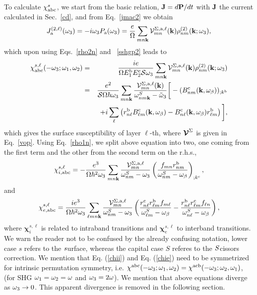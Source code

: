 \documentclass{article}
\begin{document}
To calculate $\chi_{\mathrm{a}\mathrm{b}\mathrm{c}}^s$,
we start from the basic relation, $\mathbf{J}=d\mathbf{P}/dt$ 
with $\mathbf{J}$ the current calculated in Sec.~\ref{cd}, and
from Eq.~\eqref{jmac2} we obtain
\begin{equation}\label{Pjikn}
J_{\mathrm{a}}^{(2,\ell)}(\omega_3)=-i\omega_3P_{\mathrm{a}}(\omega_3)
=\frac{e}{\Omega}
\sum_{mn\mathbf{k}}
{\mathbf{\cal V}}^{\Sigma,\mathrm{a},\ell}_{mn}(\mathbf{k})
\rho^{(2)}_{nm}(\mathbf{k};\omega_3)
,
\end{equation}
which upon using Eqs.~\eqref{rho2n} and ~\eqref{sshgp2} leads to
\begin{eqnarray}\label{Pjikn2}
\chi^{s,\ell}_{\mathrm{a}\mathrm{b}\mathrm{c}}(-\omega_3;\omega_1,\omega_2)
&=&
\frac{ie}{\Omega E^{\mathrm{b}}_1E^{\mathrm{c}}_2{\cal S} \omega_3}
\sum_{mn\mathbf{k}}
{\mathbf{\cal V}}^{\Sigma,\mathrm{a},\ell}_{mn}(\mathbf{k})
\rho^{(2)}_{nm}(\mathbf{k};\omega_3)
\nonumber \\
&=&
\frac{e^2}{{\cal S}\Omega\hbar\omega_3}
\sum_{mn\mathbf{k}}
\frac{{\mathbf{\cal V}}^{\Sigma,\mathrm{a},\ell}_{mn}(\mathbf{k})}
{\omega^S_{nm\mathbf{k}}-\tilde\omega_3}
\bigg[
-(B_{nm}^{\mathrm{c}}(\mathbf{k},\omega_\beta))_{;k^{\mathrm{b}}}
\nonumber \\
&&
+i\sum_\ell\left(r_{n\ell}^{\mathrm{b}}B_{\ell m}^{\mathrm{c}}(\mathbf{k},\omega_\beta) -
  B_{n\ell}^{\mathrm{c}}(\mathbf{k},\omega_\beta) 
  r_{\ell m}^{\mathrm{b}}\right)
\bigg]
,
\end{eqnarray}
which gives the surface susceptibility of layer $\ell$-th, where 
$\boldsymbol{\mathcal{\cal V}}^\Sigma$ is given in Eq.~\eqref{vop}.
Using Eq.~\eqref{rho1n}, we
split above equation into
two, one coming from the first term and the other
from the second term on the r.h.s.,
\begin{equation}\label{chii}
\chi_{i,\mathrm{a}\mathrm{b}\mathrm{c}}^{s,\ell}=-\frac{e^3}{\Omega\hbar^2\omega_3}\sum_{mn\mathbf{k}}
\frac{{\mathbf{\cal V}}_{mn}^{\Sigma,\mathrm{a},\ell}}{\omega^S_{nm}-\omega_3}
\left(\frac{f_{mn}r_{nm}^{\mathrm{b}}}{\omega^S_{nm}-\omega_\beta}\right)_{;k^{\mathrm{c}}},
\end{equation} 
and
\begin{equation}\label{chie}
\chi_{e,\mathrm{a}\mathrm{b}\mathrm{c}}^{s,\ell}=\frac{ie^3}{\Omega\hbar^2\omega_3}\sum_{\ell mn\mathbf{k}}
\frac{{\mathbf{\cal V}}_{mn}^{\Sigma,\mathrm{a},\ell}}{\omega^S_{nm}-\omega_3}
\left(
\frac{r_{n\ell}^{\mathrm{c}} r_{\ell m}^{\mathrm{b}} 
f_{m\ell}}{\omega^S_{\ell m}-\omega_\beta}
-\frac{r_{n\ell}^{\mathrm{b}} r_{\ell m}^{\mathrm{c}} 
f_{\ell n}}{\omega^S_{n \ell}-\omega_\beta}
\right),
\end{equation} 
where $\boldsymbol{\chi}^{s,\ell}_i$
 is related to intraband transitions and
$\boldsymbol{\chi}^{s,\ell}_e$
to interband transitions. We warn the reader not to be confused by the
already confusing notation, lower case $s$ refers to the $\it
s$urface, whereas the capital case $S$ referes to the $\it S$cissors correction.   
We mention that
Eq. (\ref{chii}) and Eq. (\ref{chie}) need to be symmetrized for intrinsic
permutation symmetry, i.e.
$\chi^{\mathrm{a}\mathrm{b}\mathrm{c}}(-\omega_3;\omega_1,\omega_2)=\chi^{\mathrm{a}\mathrm{c}\mathrm{b}}(-\omega_3;\omega_2,\omega_1)$,\cite{rashkeev_efficient_1998}
(for SHG $\omega_1=\omega_2=\omega$ and $\omega_3=2\omega$). We mention that above
equations diverge as $\omega_3\to 0$. This apparent divergence is removed
in the following section.
\end{document}
